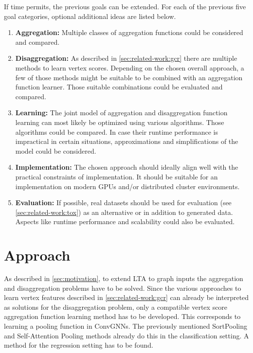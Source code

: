 \documentclass[12pt]{scrartcl}
\begin{document}
If time permits, the previous goals can be extended.
For each of the previous five goal categories, optional additional ideas are listed below.
\begin{enumerate}[label=\textbf{\arabic*.}]
	\item \textbf{Aggregation:}
		Multiple classes of aggregation functions could be considered and compared.
	\item \textbf{Disaggregation:}
		As described in \cref{sec:related-work:gcr} there are multiple methods to learn vertex scores.
		Depending on the chosen overall approach, a few of those methods might be suitable to be combined with an aggregation function learner.
		Those suitable combinations could be evaluated and compared.
	\item \textbf{Learning:}
		The joint model of aggregation and disaggregation function learning can most likely be optimized using various algorithms.
		Those algorithms could be compared.
		In case their runtime performance is impractical in certain situations, approximations and simplifications of the model could be considered.
	\item \textbf{Implementation:}
		The chosen approach should ideally align well with the practical constraints of implementation.
		It should be suitable for an implementation on modern GPUs and/or distributed cluster environments.
	\item \textbf{Evaluation:}
		If possible, real datasets should be used for evaluation (see \cref{sec:related-work:tox}) as an alternative or in addition to generated data.
		Aspects like runtime performance and scalability could also be evaluated.
\end{enumerate}

\section{Approach}%
\label{sec:approach}

As described in \cref{sec:motivation}, to extend LTA to graph inputs the aggregation and disaggregation problems have to be solved.
Since the various approaches to learn vertex features described in \cref{sec:related-work:gcr} can already be interpreted as solutions for the disaggregation problem, only a compatible vertex score aggregation function learning method has to be developed.
This corresponds to learning a pooling function in ConvGNNs.
The previously mentioned SortPooling and Self-Attention Pooling methods already do this in the classification setting.
A method for the regression setting has to be found.
\end{document}
